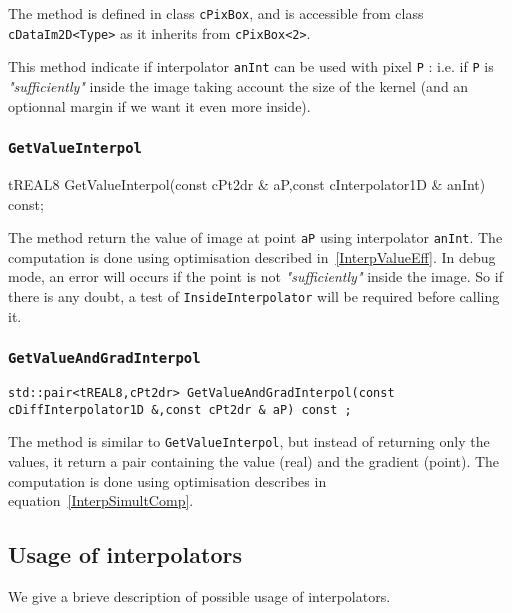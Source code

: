 The method is defined in class {\tt cPixBox}, and is accessible from class  {\tt cDataIm2D<Type>}
as it inherits from {\tt cPixBox<2>}.

This method indicate if  interpolator {\tt anInt} can be used with pixel {\tt P} : i.e. if {\tt P}
is \emph{"sufficiently"} inside the image taking account the size of the kernel (and an optionnal
margin if we want it even more inside).


\subsubsection{{\tt GetValueInterpol}}

{tREAL8 GetValueInterpol(const cPt2dr \& aP,const cInterpolator1D \& anInt) const;}

The method return the value of image at point {\tt aP} using interpolator {\tt anInt}. 
The computation is done using optimisation described in~\ref{InterpValueEff}.
In debug mode, an error will occurs if the point is not \emph{"sufficiently"} inside 
the image. So if there is any doubt, a test of {\tt InsideInterpolator} will be required before calling it.


\subsubsection{{\tt GetValueAndGradInterpol}}

{\tt std::pair<tREAL8,cPt2dr> GetValueAndGradInterpol(const cDiffInterpolator1D \&,const cPt2dr \& aP) const ;}

The method is similar to {\tt GetValueInterpol}, but instead of returning only the values, it 
return a pair containing the value (real) and the gradient (point).
The computation is done using optimisation describes in equation~\ref{InterpSimultComp}.



\subsection{Usage of interpolators}


We give a brieve description of possible usage of interpolators.

